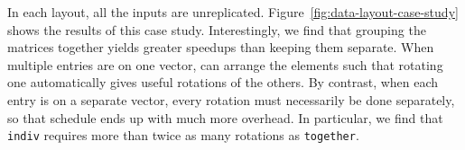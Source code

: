 In each layout, all the inputs are unreplicated.
Figure~\ref{fig:data-layout-case-study} shows the results of this case study.
Interestingly, we find that grouping the matrices together yields greater speedups than keeping them separate.
When multiple entries are on one vector, \system can arrange the elements such that rotating one automatically gives useful rotations of the others.
By contrast, when each entry is on a separate vector, every rotation must necessarily be done separately, so that schedule ends up with much more overhead. In particular, we find that {\tt indiv} requires more than twice as many rotations as {\tt together}.

